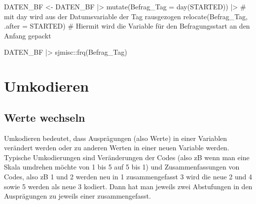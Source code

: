 \documentclass[twoside, pagesize, fontsize=11pt, dvipsnames]{scrreport}
\newenvironment{Shaded}{\begin{snugshade}}{\end{snugshade}}
\newcommand{\AttributeTok}[1]{\textcolor[rgb]{0.40,0.45,0.13}{#1}}
\newcommand{\CommentTok}[1]{\textcolor[rgb]{0.37,0.37,0.37}{#1}}
\newcommand{\FunctionTok}[1]{\textcolor[rgb]{0.28,0.35,0.67}{#1}}
\newcommand{\NormalTok}[1]{\textcolor[rgb]{0.00,0.23,0.31}{#1}}
\newcommand{\OtherTok}[1]{\textcolor[rgb]{0.00,0.23,0.31}{#1}}
\newcommand{\SpecialCharTok}[1]{\textcolor[rgb]{0.37,0.37,0.37}{#1}}
\begin{document}
\begin{Shaded}
\begin{Highlighting}[]
\NormalTok{DATEN\_BF }\OtherTok{\textless{}{-}}\NormalTok{ DATEN\_BF }\SpecialCharTok{|\textgreater{}} 
  \FunctionTok{mutate}\NormalTok{(}\AttributeTok{Befrag\_Tag =} \FunctionTok{day}\NormalTok{(STARTED)) }\SpecialCharTok{|\textgreater{}} \CommentTok{\# mit day wird aus der Datumsvariable der Tag rausgezogen}
  \FunctionTok{relocate}\NormalTok{(Befrag\_Tag, }\AttributeTok{.after =}\NormalTok{ STARTED) }\CommentTok{\# Hiermit wird die Variable für den Befragungsstart an den Anfang gepackt}

\NormalTok{DATEN\_BF }\SpecialCharTok{|\textgreater{}}\NormalTok{ sjmisc}\SpecialCharTok{::}\FunctionTok{frq}\NormalTok{(Befrag\_Tag)}
\end{Highlighting}
\end{Shaded}

\hypertarget{umkodieren}{%
\section{Umkodieren}\label{umkodieren}}

\hypertarget{werte-wechseln}{%
\subsection{Werte wechseln}\label{werte-wechseln}}

Umkodieren bedeutet, dass Ausprägungen (also Werte) in einer Variablen
verändert werden oder zu anderen Werten in einer neuen Variable werden.
Typische Umkodierungen sind Veränderungen der Codes (also zB wenn man
eine Skala umdrehen möchte von 1 bis 5 auf 5 bis 1) und
Zusammenfassungen von Codes, also zB 1 und 2 werden neu in 1
zusammengefasst 3 wird die neue 2 und 4 sowie 5 werden als neue 3
kodiert. Dann hat man jeweils zwei Abstufungen in den Ausprägungen zu
jeweils einer zusammengefasst.
\end{document}
